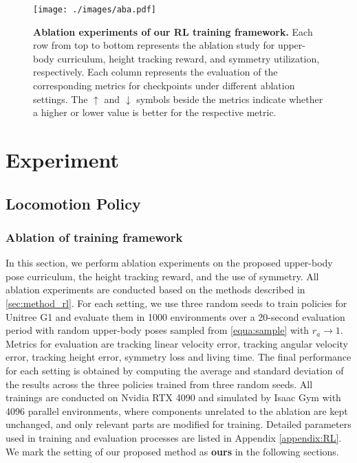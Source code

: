 \begin{figure*}[!ht]
  \centering
  \texttt{[image: ./images/aba.pdf]}
  \caption{\textbf{Ablation experiments of our RL training framework.} Each row from top to bottom represents the ablation study for upper-body curriculum, height tracking reward, and symmetry utilization, respectively. Each column represents the evaluation of the corresponding metrics for checkpoints under different ablation settings. The $\uparrow$ and $\downarrow$ symbols beside the metrics indicate whether a higher or lower value is better for the respective metric.}
  \label{fig:rl_exp}
  \vspace{-8pt}
\end{figure*}
\section{Experiment}

\subsection{Locomotion Policy}

\subsubsection{Ablation of training framework}
\label{sec:abla}
In this section, we perform ablation experiments on the proposed upper-body pose curriculum, the height tracking reward, and the use of symmetry. All ablation experiments are conducted based on the methods described in \cref{sec:method_rl}. For each setting, we use three random seeds to train policies for Unitree G1 and evaluate them in 1000 environments over a 20-second evaluation period with random upper-body poses sampled from \cref{equa:sample} with $r_a\rightarrow1$. Metrics for evaluation are tracking linear velocity error, tracking angular velocity error, tracking height error, symmetry loss and living time. The final performance for each setting is obtained by computing the average and standard deviation of the results across the three policies trained from three random seeds. All trainings are conducted on Nvidia RTX 4090 and simulated by Isaac Gym with 4096 parallel environments, where components unrelated to the ablation are kept unchanged, and only relevant parts are modified for training. Detailed parameters used in training and evaluation processes are listed in Appendix \ref{appendix:RL}. We mark the setting of our proposed method as \textbf{ours} in the following sections.

